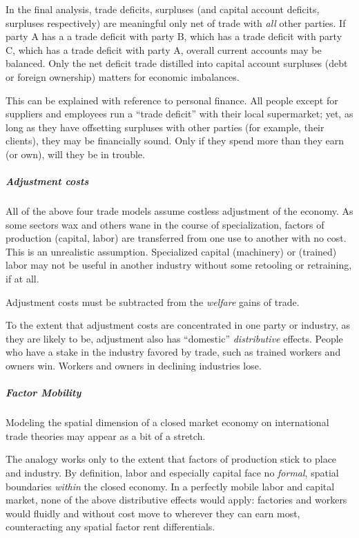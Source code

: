 In the final analysis, trade deficits, surpluses (and capital account deficits, surpluses respectively) are meaningful only net of trade with \emph{all} other parties. If party A has a a trade deficit with party B, which has a trade deficit with party C, which has a trade deficit with party A, overall current accounts may be balanced. Only the net deficit trade distilled into capital account surpluses (debt or foreign ownership) matters for economic imbalances. 

This can be explained with reference to personal finance. All people except for suppliers and employees run a ``trade deficit'' with their local supermarket; yet, as long as they have offsetting surpluses with other parties (for example, their clients), they may be financially sound. Only if they spend more than they earn (or own), will they be in trouble.%

\subparagraph{Adjustment costs}  \label{sec:adjustment-costs}
All of the above four trade models assume costless adjustment of the economy. As some sectors wax and others wane in the course of specialization, factors of production (capital, labor) are transferred from one use to another with no cost. This is an unrealistic assumption. Specialized capital (machinery) or (trained) labor may not be useful in another industry without some retooling or retraining, if at all. 

Adjustment costs must be subtracted from the \emph{welfare} gains of trade.

To the extent that adjustment costs are concentrated in one party or industry, as they are likely to be, adjustment also has ``domestic'' \emph{distributive} effects. People who have a stake in the industry favored by trade, such as trained workers and owners win. Workers and owners in declining industries lose.

\subparagraph{Factor Mobility}  \label{sec:factor-mobility-trade}
Modeling the spatial dimension of a closed market economy on international trade theories may appear as a bit of a stretch. 

The analogy works only to the extent that factors of production stick to place and industry. By definition, labor and especially capital face no \emph{formal}, spatial boundaries \emph{within} the closed economy. In a perfectly mobile labor and capital market, none of the above distributive effects would apply: factories and workers would fluidly and without cost move to wherever they can earn most, counteracting any spatial factor rent differentials. 


